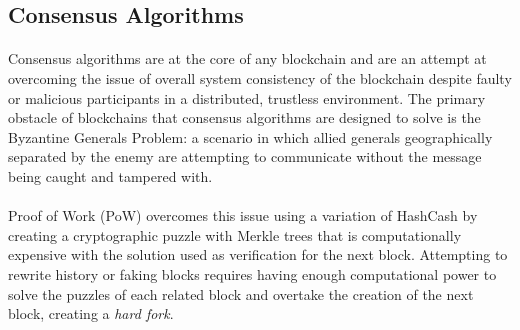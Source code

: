 
\subsection{Consensus Algorithms}


\paragraph{} Consensus algorithms are at the core of any blockchain and are an attempt at overcoming the issue of overall system consistency of the blockchain despite faulty or malicious participants in a distributed, trustless environment. The primary obstacle of blockchains that consensus algorithms are designed to solve is the Byzantine Generals Problem:  a scenario in which allied generals geographically separated by the enemy are attempting to communicate without the message being caught and tampered with. 

\paragraph{} Proof of Work (PoW) overcomes this issue using a variation of HashCash \cite{back2002} by creating a cryptographic puzzle with Merkle trees  that is computationally expensive with the solution used as verification for the next block. Attempting to rewrite history or faking blocks requires having enough computational power to solve the puzzles of each related block and overtake the creation of the next block, creating a \textit{hard fork}.


